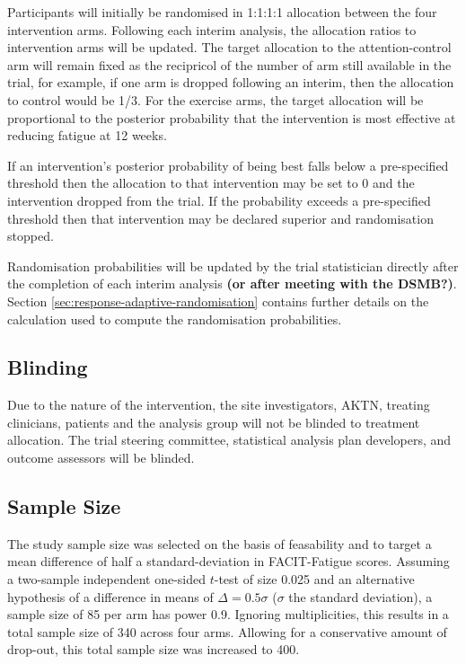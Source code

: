 \documentclass[11pt,parskip=half-]{scrartcl}
\begin{document}
Participants will initially be randomised in 1:1:1:1 allocation between the four intervention arms. Following each interim analysis, the allocation ratios to intervention arms will be updated. The target allocation to the attention-control arm will remain fixed as the recipricol of the number of arm still available in the trial, for example, if one arm is dropped following an interim, then the allocation to control would be 1/3. For the exercise arms, the target allocation will be proportional to the posterior probability that the intervention is most effective at reducing fatigue at 12 weeks.

If an intervention's posterior probability of being best falls below a pre-specified threshold then the allocation to that intervention may be set to 0 and the intervention dropped from the trial. If the probability exceeds a pre-specified threshold then that intervention may be declared superior and randomisation stopped.

Randomisation probabilities will be updated by the trial statistician directly after the completion of each interim analysis \textbf{(or after meeting with the DSMB?)}. Section \ref{sec:response-adaptive-randomisation} contains further details on the calculation used to compute the randomisation probabilities.

\subsection{Blinding}\label{blinding}

Due to the nature of the intervention, the site investigators, AKTN, treating clinicians, patients and the analysis group will not be blinded to treatment allocation. The trial steering committee, statistical analysis plan developers, and outcome assessors will be blinded.

\subsection{Sample Size}\label{sample-size}

The study sample size was selected on the basis of feasability and to target a mean difference of half a standard-deviation in FACIT-Fatigue scores. Assuming a two-sample independent one-sided $t$-test of size 0.025 and an alternative hypothesis of a difference in means of $\Delta=0.5\sigma$ ($\sigma$ the standard deviation), a sample size of 85 per arm has power 0.9. Ignoring multiplicities, this results in a total sample size of 340 across four arms. Allowing for a conservative amount of drop-out, this total sample size was increased to 400.
\end{document}
